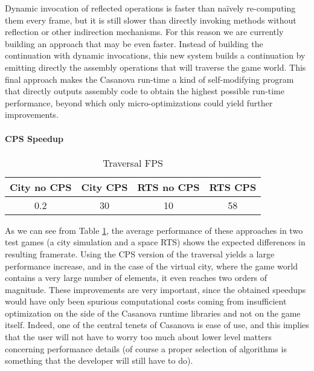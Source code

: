 Dynamic invocation of reflected operations is faster than naïvely re-computing them every frame, but it is still slower than directly invoking methods without reflection or other indirection mechanisms. For this reason we are currently building an approach that may be even faster. Instead of building the continuation with dynamic invocations, this new system builds a continuation by emitting directly the assembly operations that will traverse the game world. This final approach makes the Casanova run-time a kind of self-modifying program that directly outputs assembly code to obtain the highest possible run-time performance, beyond which only micro-optimizations could yield further improvements.

\paragraph{CPS Speedup}

\begin{table}[ht]
\centering
\begin{tabular}{ c | c | c | c }
   City no CPS & City CPS & RTS no CPS & RTS CPS \\
   \hline
   0.2 & 30 & 10 & 58 \\
\end{tabular}
\caption{Traversal FPS}
\label{table:traversal_fps}
\end{table}

As we can see from Table \ref{table:traversal_fps}, the average performance of these approaches in two test games (a city simulation and a space RTS) shows the expected differences in resulting framerate. Using the CPS version of the traversal yields a large performance increase, and in the case of the virtual city, where the game world contains a very large number of elements, it even reaches two orders of magnitude. These improvements are very important, since the obtained speedups would have only been spurious computational costs coming from insufficient optimization on the side of the Casanova runtime libraries and not on the game itself. Indeed, one of the central tenets of Casanova is ease of use, and this implies that the user will not have to worry too much about lower level matters concerning performance details (of course a proper selection of algorithms is something that the developer will still have to do).

